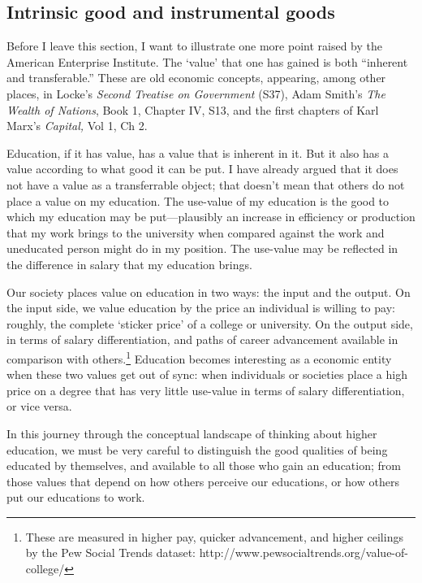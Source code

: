 \subsection{Intrinsic good and instrumental goods}
\label{intrinsicgoodandinstrumentalgoods}

Before I leave this section, I want to illustrate one more point raised by the American Enterprise Institute. The `value' that one has gained is both ``inherent and transferable.'' These are old economic concepts, appearing, among other places, in Locke's \emph{Second Treatise on Government} (S37), Adam Smith's \emph{The Wealth of Nations}, Book 1, Chapter IV, S13, and the first chapters of Karl Marx's \emph{Capital,} Vol 1, Ch 2. 

Education, if it has value, has a value that is inherent in it. But it also has a value according to what good it can be put. I have already argued that it does not have a value as a transferrable object; that doesn't mean that others do not place a value on my education. The use-value of my education is the good to which my education may be put---plausibly an increase in efficiency or production that my work brings to the university when compared against the work and uneducated person might do in my position. The use-value may be reflected in the difference in salary that my education brings.

Our society places value on education in two ways: the input and the output. On the input side, we value education by the price an individual is willing to pay: roughly, the complete `sticker price' of a college or university. On the output side, in terms of salary differentiation, and paths of career advancement available in comparison with others.\footnote{These are measured in higher pay, quicker advancement, and higher ceilings by the Pew Social Trends dataset: http:\slash \slash www.pewsocialtrends.org\slash value-of-college\slash } Education becomes interesting as a economic entity when these two values get out of sync: when individuals or societies place a high price on a degree that has very little use-value in terms of salary differentiation, or vice versa. 

In this journey through the conceptual landscape of thinking about higher education, we must be very careful to distinguish the good qualities of being educated by themselves, and available to all those who gain an education; from those values that depend on how others perceive our educations, or how others put our educations to work. 

